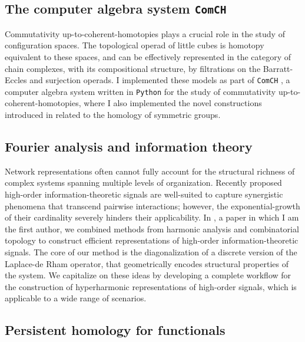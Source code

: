 \documentclass{amsart}
\theoremstyle{definition}
\begin{document}
	\subsection{The computer algebra system \texttt{ComCH}}
	Commutativity up-to-coherent-homotopies plays a crucial role in the study of configuration spaces.
	The topological operad of little cubes is homotopy equivalent to these spaces, and can be effectively represented in the category of chain complexes, with its compositional structure, by filtrations on the Barratt-Eccles and surjection operads.
	I implemented these models as part of \texttt{ComCH} \cite{medina2021computer}, a computer algebra system written in \texttt{Python} for the study of commutativity up-to-coherent-homotopies, where I also implemented the novel constructions introduced in \cite{medina2020odd} related to the homology of symmetric groups.

	\subsection{Fourier analysis and information theory}
	Network representations often cannot fully account for the structural richness of complex systems spanning multiple levels of organization.
	Recently proposed high-order information-theoretic signals are well-suited to capture synergistic phenomena that transcend pairwise interactions; however, the exponential-growth of their cardinality severely hinders their applicability.
	In \cite{medina2021hyperharmonic}, a paper in which I am the first author, we combined methods from harmonic analysis and combinatorial topology to construct efficient representations of high-order information-theoretic signals.
	The core of our method is the diagonalization of a discrete version of the Laplace-de Rham operator, that geometrically encodes structural properties of the system.
	We capitalize on these ideas by developing a complete workflow for the construction of hyperharmonic representations of high-order signals, which is applicable to a wide range of scenarios.

	\subsection{Persistent homology for functionals}
\end{document}
